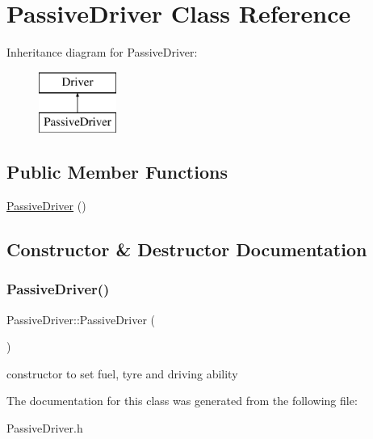 \hypertarget{class_passive_driver}{}\section{Passive\+Driver Class Reference}
\label{class_passive_driver}
Inheritance diagram for Passive\+Driver\+:\begin{figure}[H]
\begin{center}
\leavevmode
\includegraphics[height=2.000000cm]{class_passive_driver}
\end{center}
\end{figure}
\subsection*{Public Member Functions}
\begin{DoxyCompactItemize}
\item 
\mbox{\hyperlink{class_passive_driver_ab1a26042d9177fe09183694057ca0b61}{Passive\+Driver}} ()
\end{DoxyCompactItemize}


\subsection{Constructor \& Destructor Documentation}
\mbox{\label{class_passive_driver_ab1a26042d9177fe09183694057ca0b61}} 
\subsubsection{\texorpdfstring{Passive\+Driver()}{PassiveDriver()}}
{\footnotesize\ttfamily Passive\+Driver\+::\+Passive\+Driver (\begin{DoxyParamCaption}{ }\end{DoxyParamCaption})\hspace{0.3cm}{\ttfamily [inline]}}

constructor to set fuel, tyre and driving ability 

The documentation for this class was generated from the following file\+:\begin{DoxyCompactItemize}
\item 
Passive\+Driver.\+h\end{DoxyCompactItemize}
